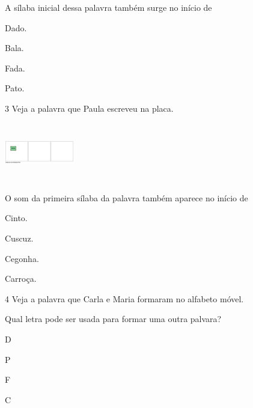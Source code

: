 
A sílaba inicial dessa palavra também surge no início de

\begin{escolha}
\item Dado.

\item Bala.

\item Fada.

\item Pato.
\end{escolha}

\num{3} Veja a palavra que Paula escreveu na placa.

\includegraphics[width=1.19861in,height=1.00625in]{media/image176.png}


O som da primeira sílaba da palavra também aparece no início de

\begin{escolha}
\item Cinto.

\item Cuscuz.

\item Cegonha.

\item Carroça.
\end{escolha}


\num{4} Veja a palavra que Carla e Maria formaram no alfabeto móvel.

Qual letra pode ser usada para formar uma outra palvara?

\begin{escolha}
\item D

\item P

\item F

\item C
\end{escolha}

